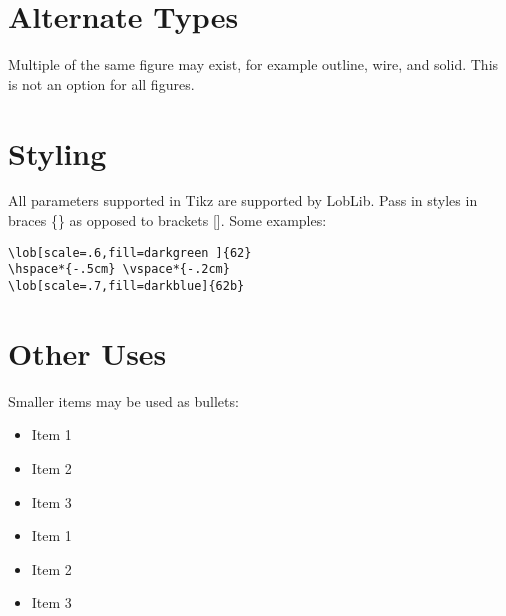 \documentclass[11pt]{article}
\begin{document}
\section*{Alternate Types}
Multiple of the same figure may exist, for example outline, wire, and solid. This is not an option for all figures. \\

\vspace*{1em}




\pagebreak

\section*{Styling}
All parameters supported in Tikz are supported by LobLib. Pass in styles in braces \{\} as opposed to brackets []. Some examples:
\vspace*{1cm}

\begin{multicols}{2}
\begin{verbatim}
\lob[scale=.6,fill=darkgreen ]{62}   
\hspace*{-.5cm} \vspace*{-.2cm}
\lob[scale=.7,fill=darkblue]{62b}
\end{verbatim}

\hspace*{-.5cm} \vspace*{-.2cm} 
\end{multicols}

\section*{Other Uses}
Smaller items may be used as bullets:

\begin{multicols}{2} 
\begin{itemize}
\item[\lobclaw{claw_simple}] Item 1
\item[\lobclaw{claw_simple}] Item 2
\item[\lobclaw{claw_simple}] Item 3
\end{itemize}

\begin{itemize}
\item[\lob{29}] Item 1
\item[\lob{29}] Item 2
\item[\lob{29}] Item 3
\end{itemize}
\end{multicols} 
\end{document}
